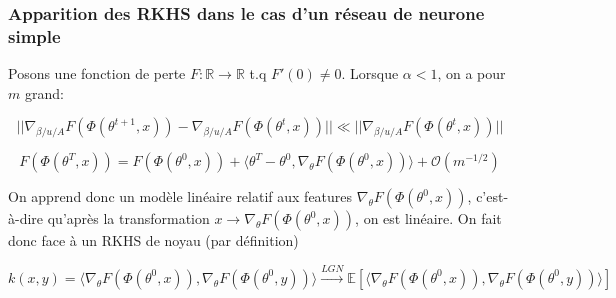 \documentclass[aspectratio=169]{beamer}
\begin{document}
\begin{frame}
	\frametitle{Apparition des RKHS dans le cas d'un réseau de neurone simple}
	Posons une fonction de perte $F : \mathbb{R} \rightarrow \mathbb{R}$ t.q $F'(0) \neq 0$. Lorsque $\alpha < 1$, on a pour $m$ grand:
	
	\[||\nabla_{\beta / u / A} F(\Phi(\theta^{t+1}, x)) - \nabla_{\beta / u / A} F(\Phi(\theta^{t}, x)) || \ll ||\nabla_{\beta / u / A} F(\Phi(\theta^{t}, x))||\]
	
	\pause
	
	\[F(\Phi(\theta^{T}, x)) = F(\Phi(\theta^{0}, x)) + \langle \theta^{T}-\theta^0 , \nabla_{\theta} F(\Phi(\theta^0, x))  \rangle  + \mathcal{O}(m^{-1/2})\]
	
	\pause
	
	On apprend donc un modèle linéaire relatif aux features $\nabla_{\theta} F(\Phi(\theta^0, x))$, c'est-à-dire qu'après la transformation $x \rightarrow \nabla_{\theta} F(\Phi(\theta^0, x))$, on est linéaire. On fait donc face à un RKHS de noyau (par définition) 
	
	\[k(x,y)=\langle\nabla_{\theta} F(\Phi(\theta^0, x)),\nabla_{\theta} F(\Phi(\theta^0, y))\rangle \stackrel{LGN}{\longrightarrow} \mathbb{E}[\langle\nabla_{\theta} F(\Phi(\theta^0, x)),\nabla_{\theta} F(\Phi(\theta^0, y))\rangle]\]
\end{frame}
\end{document}
